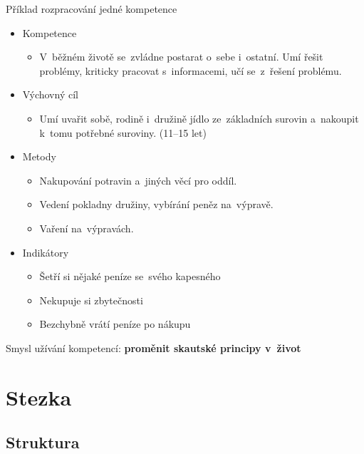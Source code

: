 \documentclass[compress, xelatex, 11pt, xcolor=dvipsnames, print, aspectratio=169,
	hyperref={
		bookmarks=true,
		unicode=true,
		colorlinks=true,
		pdftitle={Skautska vychovna metoda},
		plainpages=false,
		pdfauthor={Vojtech Zeisek},
		pdfsubject={Skautska vychovna metoda a jeji vyvoj za posledni stoleti a desetileti},
		pdfcreator={XeLaTeX},
		pdfkeywords={Junak, Pedagogika, Skaut, Skauting, Vychovna metoda},
		linkcolor=Red, %
		anchorcolor=ForestGreen, %
		citecolor=ForestGreen, %
		filecolor=ForestGreen, %
		menucolor=ForestGreen, %
		urlcolor=Sepia, %
		pdftex},
	url={hyphens, lowtilde} %
	]{beamer}
\begin{document}
\begin{frame}{Příklad rozpracování jedné kompetence}
	\begin{itemize}
		\item Kompetence
		\begin{itemize}
			\item V~běžném životě se~zvládne postarat o~sebe i~ostatní. Umí řešit problémy, kriticky pracovat s~informacemi, učí se~z~řešení problému.
		\end{itemize}
		\item Výchovný cíl
		\begin{itemize}
			\item Umí uvařit sobě, rodině i~družině jídlo ze~základních surovin a~nakoupit k~tomu potřebné suroviny. (11--15 let)
		\end{itemize}
		\item Metody
		\begin{itemize}
			\item Nakupování potravin a~jiných věcí pro oddíl.
			\item Vedení pokladny družiny, vybírání peněz na~výpravě.
			\item Vaření na~výpravách.
		\end{itemize}
		\item Indikátory
		\begin{itemize}
			\item Šetří si nějaké peníze se~svého kapesného
			\item Nekupuje si zbytečnosti
			\item Bezchybně vrátí peníze po nákupu
		\end{itemize}
	\end{itemize}
	\alert{Smysl užívání kompetencí: \textbf{proměnit skautské principy v~život}}
\end{frame}

\section{Stezka}

\subsection{Struktura}
\end{document}
